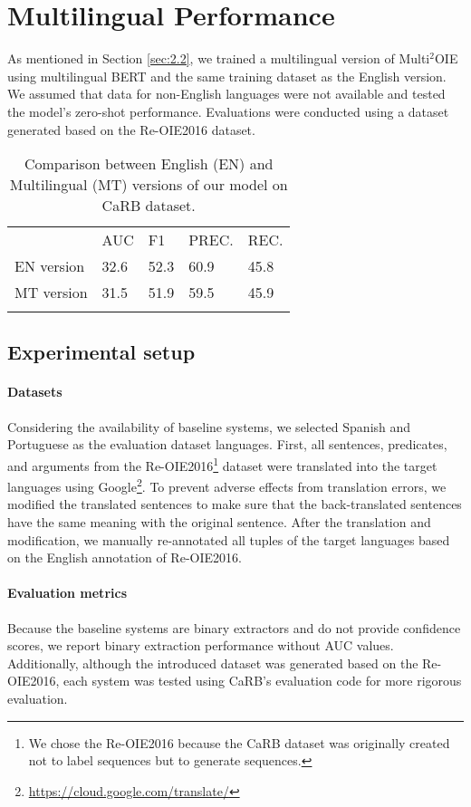 \documentclass[11pt,a4paper]{article}
\begin{document}
\section{Multilingual Performance}
\label{sec:5}
As mentioned in Section \ref{sec:2.2}, we trained a multilingual version of Multi$^2$OIE using multilingual BERT and the same training dataset as the English version.
We assumed that data for non-English languages were not available and tested the model's zero-shot performance.
Evaluations were conducted using a dataset generated based on the Re-OIE2016 dataset.

\begin{table}[t]
\centering
\begin{tabularx}{\columnwidth}{l|YYYY}
                  & AUC  & F1   & PREC. & REC. \\ 
\small EN version & 32.6 & 52.3 & 60.9  & 45.8 \\
\small MT version & 31.5 & 51.9 & 59.5  & 45.9 \\
\end{tabularx}
\caption
{
Comparison between English (EN) and Multilingual (MT) versions of our model on CaRB dataset.
}
\label{tab:6}
\end{table}

\subsection{Experimental setup}
\paragraph{Datasets}
Considering the availability of baseline systems, we selected Spanish and Portuguese as the evaluation dataset languages.
First, all sentences, predicates, and arguments from the Re-OIE2016\footnote{We chose the Re-OIE2016 because the CaRB dataset was originally created not to label sequences but to generate sequences.} dataset were translated into the target languages using Google\footnote{\url{https://cloud.google.com/translate/}}.
To prevent adverse effects from translation errors, we modified the translated sentences to make sure that the back-translated sentences have the same meaning with the original sentence.
After the translation and modification, we manually re-annotated all tuples of the target languages based on the English annotation of Re-OIE2016.

\paragraph{Evaluation metrics}
Because the baseline systems are binary extractors and do not provide confidence scores, we report binary extraction performance without AUC values.
Additionally, although the introduced dataset was generated based on the Re-OIE2016, each system was tested using CaRB's evaluation code for more rigorous evaluation.
\end{document}
